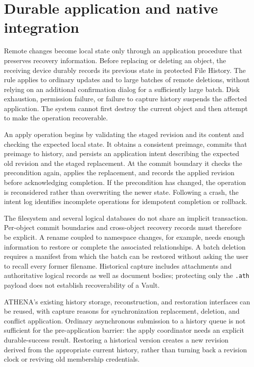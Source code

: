 \documentclass[11pt,a4paper]{article}
\theoremstyle{definition}
\theoremstyle{plain}
\begin{document}
\section{Durable application and native integration}
\label{sec:integration}

Remote changes become local state only through an application procedure
that preserves recovery information. Before replacing or deleting an
object, the receiving device durably records its previous state in
protected File History. The rule applies to ordinary updates and to
large batches of remote deletions, without relying on an additional
confirmation dialog for a sufficiently large batch. Disk exhaustion,
permission failure, or failure to capture history suspends the affected
application. The system cannot first destroy the current object and
then attempt to make the operation recoverable.

An apply operation begins by validating the staged revision and its
content and checking the expected local state. It obtains a consistent
preimage, commits that preimage to history, and persists an application
intent describing the expected old revision and the staged replacement.
At the commit boundary it checks the precondition again, applies the
replacement, and records the applied revision before acknowledging
completion. If the precondition has changed, the operation is reconsidered
rather than overwriting the newer state. Following a crash, the intent
log identifies incomplete operations for idempotent completion or rollback.

The filesystem and several logical databases do not share an implicit
transaction. Per-object commit boundaries and cross-object recovery
records must therefore be explicit. A rename coupled to namespace
changes, for example, needs enough information to restore or complete
the associated relationships. A batch deletion requires a manifest
from which the batch can be restored without asking the user to recall
every former filename. Historical capture includes attachments and
authoritative logical records as well as document bodies; protecting
only the \texttt{.ath} payload does not establish recoverability of a
Vault.

ATHENA's existing history storage, reconstruction, and restoration
interfaces can be reused, with capture reasons for synchronization
replacement, deletion, and conflict application. Ordinary asynchronous
submission to a history queue is not sufficient for the pre-application
barrier: the apply coordinator needs an explicit durable-success result.
Restoring a historical version creates a new revision derived from
the appropriate current history, rather than turning back a revision
clock or reviving old membership credentials.
\end{document}
